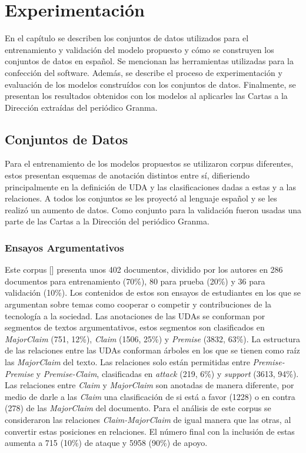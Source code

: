 \chapter{Experimentación}\label{chapter:implementation}

En el capítulo se describen los conjuntos de datos utilizados para el entrenamiento y validación del modelo 
propuesto y cómo se construyen los conjuntos de datos en español. Se mencionan las herramientas utilizadas 
para la confección del software. Además, se describe el 
proceso de experimentación y evaluación de los modelos construídos con los conjuntos de datos. Finalmente,
se presentan los resultados obtenidos con los modelos al aplicarles las Cartas a la Dirección extraídas 
del periódico Granma. 

\section{Conjuntos de Datos}

Para el entrenamiento de los modelos propuestos se utilizaron corpus diferentes, estos
presentan esquemas de anotación distintos entre sí, difieriendo principalmente en la definición de UDA y 
las clasificaciones dadas a estas y a las relaciones. A todos los conjuntos se les proyectó al lenguaje 
español y se les realizó un aumento de datos. Como conjunto para la validación fueron usadas 
una parte de las Cartas a la Dirección del periódico Granma.

\subsection{Ensayos Argumentativos}\label{corpus:persuasive_essays}

Este corpus [\cite{stab2017parsing}] presenta unos 402 documentos, dividido por los autores en 286 documentos para entrenamiento (70\%), 
80 para prueba (20\%) y 36 para validación (10\%). Los contenidos de estos son ensayos de estudiantes en los que 
se argumentan sobre temas como cooperar o competir y contribuciones de la tecnología a la sociedad.
Las anotaciones de las UDAs se conforman por segmentos de textos argumentativos, estos segmentos son 
clasificados en \emph{MajorClaim} (751, 12\%), \emph{Claim} (1506, 25\%) y \emph{Premise} (3832, 63\%).
La estructura de las relaciones entre las UDAs conforman árboles en los que se tienen como raíz las 
\emph{MajorClaim} del texto. Las relaciones solo están permitidas entre \emph{Premise-Premise} y \emph{Premise-Claim}, clasificadas
en \emph{attack} (219, 6\%) y \emph{support} (3613, 94\%). Las relaciones entre \emph{Claim} y \emph{MajorClaim} son anotadas 
de manera diferente, por medio de 
darle a las \emph{Claim} una clasificación de si está a favor (1228) o en contra (278) de las \emph{MajorClaim} del documento.
Para el análisis de este corpus se consideraron las relaciones \emph{Claim-MajorClaim} de igual manera que las otras,
al convertir estas posiciones en relaciones. El número final con la inclusión de estas aumenta a 715 (10\%) de ataque y 
5958 (90\%) de apoyo.

